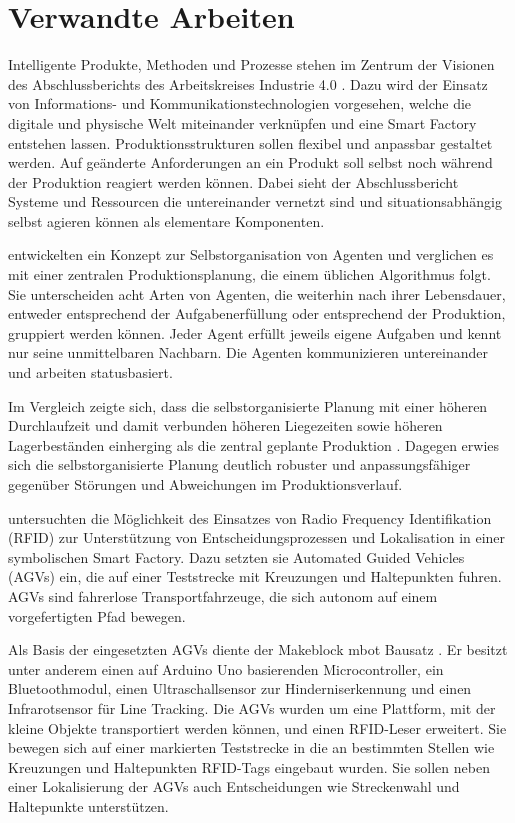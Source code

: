 \chapter{Verwandte Arbeiten}

Intelligente Produkte, Methoden und Prozesse stehen im Zentrum der Visionen des Abschlussberichts des Arbeitskreises Industrie 4.0 \parencite{arbeitsbericht}. Dazu wird der Einsatz von Informations- und Kommunikationstechnologien vorgesehen, welche die digitale und physische Welt miteinander verknüpfen und eine Smart Factory entstehen lassen.  Produktionsstrukturen sollen flexibel und anpassbar gestaltet werden. Auf geänderte Anforderungen an ein Produkt soll selbst noch während der Produktion reagiert werden können. Dabei sieht der Abschlussbericht Systeme und Ressourcen die untereinander vernetzt sind und situationsabhängig selbst agieren können als elementare Komponenten.

\textcite{agents} entwickelten ein Konzept zur Selbstorganisation von Agenten und verglichen es mit einer zentralen Produktionsplanung, die einem üblichen Algorithmus folgt. Sie unterscheiden acht Arten von Agenten, die weiterhin nach ihrer Lebensdauer, entweder entsprechend der Aufgabenerfüllung oder entsprechend der Produktion, gruppiert werden können. Jeder Agent erfüllt jeweils eigene Aufgaben und kennt nur seine unmittelbaren Nachbarn. Die Agenten kommunizieren untereinander und arbeiten statusbasiert.

Im Vergleich zeigte sich, dass die selbstorganisierte Planung mit einer höheren Durchlaufzeit und damit verbunden höheren Liegezeiten sowie höheren Lagerbeständen einherging als die zentral geplante Produktion \parencite{agents}. Dagegen erwies sich die selbstorganisierte Planung deutlich robuster und anpassungsfähiger gegenüber Störungen und Abweichungen im Produktionsverlauf.

\textcite{rfid} untersuchten die Möglichkeit des Einsatzes von Radio Frequency Identifikation (RFID) zur Unterstützung von Entscheidungsprozessen und Lokalisation in einer symbolischen Smart Factory. Dazu setzten sie Automated Guided Vehicles (AGVs) ein, die auf einer Teststrecke mit Kreuzungen und Haltepunkten fuhren. AGVs sind fahrerlose Transportfahrzeuge, die sich autonom auf einem vorgefertigten Pfad bewegen.

Als Basis der eingesetzten AGVs diente der Makeblock mbot Bausatz \parencite{rfid}. Er besitzt unter anderem einen auf Arduino Uno basierenden Microcontroller, ein Bluetoothmodul, einen Ultraschallsensor zur Hinderniserkennung und einen Infrarotsensor für Line Tracking. Die AGVs wurden um eine Plattform, mit der kleine Objekte transportiert werden können, und einen RFID-Leser erweitert. Sie bewegen sich auf einer markierten Teststrecke in die an bestimmten Stellen wie Kreuzungen und Haltepunkten RFID-Tags eingebaut wurden. Sie sollen neben einer Lokalisierung der AGVs auch Entscheidungen wie Streckenwahl und Haltepunkte unterstützen.


